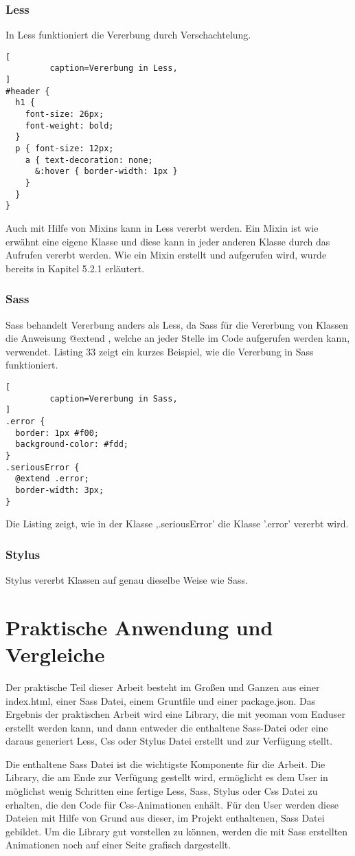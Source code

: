 \subsubsection{Less}
In Less funktioniert die Vererbung durch Verschachtelung.
\begin{lstlisting}[
         caption=Vererbung in Less,
]
#header {
  h1 {
    font-size: 26px;
    font-weight: bold;
  }
  p { font-size: 12px;
    a { text-decoration: none;
      &:hover { border-width: 1px }
    }
  }
}
\end{lstlisting}
Auch mit Hilfe von Mixins kann in Less vererbt werden. Ein Mixin ist wie erwähnt eine eigene Klasse und diese kann in jeder anderen Klasse durch das Aufrufen vererbt werden. Wie ein Mixin erstellt und aufgerufen wird, wurde bereits in Kapitel 5.2.1 erläutert.
\subsubsection{Sass}
Sass behandelt Vererbung anders als Less, da Sass für die Vererbung von Klassen die Anweisung \grqq{}@extend \glqq{}, welche an jeder Stelle im Code aufgerufen werden kann, verwendet. Listing 33 zeigt ein kurzes Beispiel, wie die Vererbung in Sass funktioniert.
\begin{lstlisting}[
         caption=Vererbung in Sass,
]
.error {
  border: 1px #f00;
  background-color: #fdd;
}
.seriousError {
  @extend .error;
  border-width: 3px;
}
\end{lstlisting}
Die Listing zeigt, wie in der Klasse ,.seriousError' die Klasse '.error' vererbt wird.
\subsubsection{Stylus}
Stylus vererbt Klassen auf genau dieselbe Weise wie Sass. 
\newpage
\section{Praktische Anwendung und Vergleiche}
Der praktische Teil dieser Arbeit besteht im Großen und Ganzen aus einer index.html, einer Sass Datei, einem Gruntfile und einer package.json.  Das Ergebnis der praktischen Arbeit wird eine Library, die mit yeoman vom Enduser erstellt werden kann, und dann entweder die enthaltene Sass-Datei oder eine daraus generiert Less, Css oder Stylus Datei erstellt und zur Verfügung stellt.

Die enthaltene Sass Datei ist die wichtigste Komponente für die Arbeit. Die Library, die am  Ende zur Verfügung gestellt wird, ermöglicht es dem User in möglichst wenig Schritten eine fertige Less, Sass, Stylus oder Css Datei zu erhalten, die den Code für Css-Animationen enhält. Für den User werden diese Dateien mit Hilfe von Grund aus dieser, im Projekt enthaltenen, Sass Datei gebildet.\newline
Um die Library gut vorstellen zu können, werden die mit Sass erstellten Animationen noch auf einer Seite grafisch dargestellt.\newline

